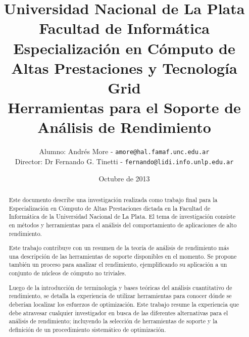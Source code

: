 \documentclass[a4paper]{report}
\begin{document}
\renewcommand{\tablename}{Tabla}

\title{Universidad Nacional de La Plata\\Facultad de Informática\\ \bigskip
  Especialización en Cómputo de Altas Prestaciones y Tecnología Grid\\ \bigskip
  Herramientas para el Soporte de Análisis de Rendimiento}

\author{
  Alumno: Andrés More - {\tt amore@hal.famaf.unc.edu.ar}\\
  Director: Dr Fernando G. Tinetti - {\tt fernando@lidi.info.unlp.edu.ar}
}

\date{Octubre de 2013}

\maketitle

\begin{abstract}

 Este documento describe una investigación realizada como trabajo final para la Especialización en Cómputo de Altas Prestaciones dictada en la Facultad de Informática de la Universidad Nacional de La Plata. El tema de investigación consiste en métodos y herramientas para el análisis del comportamiento de aplicaciones de alto rendimiento.

  \bigskip

  Este trabajo contribuye con un resumen de la teoría de análisis de rendimiento más una descripción de las herramientas de soporte 
  disponibles en el momento. Se propone también un proceso para analizar el rendimiento, ejemplificando su aplicación a un conjunto de núcleos de
  cómputo no triviales.

\bigskip

  Luego de la introducción de terminología y bases teóricas del análisis cuantitativo de rendimiento, se detalla la experiencia de utilizar herramientas para conocer dónde se deberían localizar los esfuerzos de optimización.  Este trabajo resume la experiencia que debe atravesar cualquier investigador en busca de las diferentes alternativas para el análisis de rendimiento; incluyendo la selección de herramientas de soporte y la definición de un procedimiento sistemático de optimización.

  \bigskip

\end{abstract}

\tableofcontents
\end{document}
